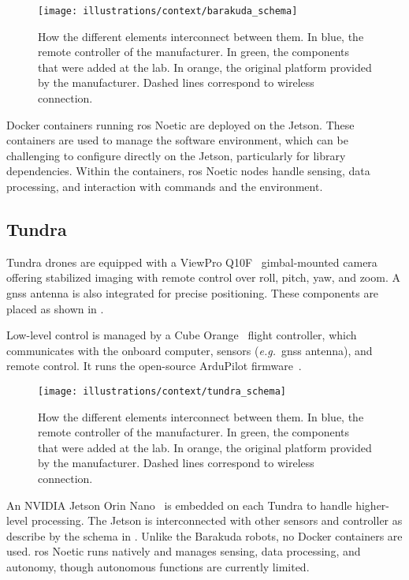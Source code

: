 \begin{figure}[ht!]
    \centering
    \texttt{[image: illustrations/context/barakuda\_schema]}
    \caption{How the different elements interconnect between them.
    In blue, the remote controller of the manufacturer.
    In green, the components that were added at the lab.
    In orange, the original platform provided by the manufacturer.
    Dashed lines correspond to wireless connection.}
    \label{fig:context:barakuda_schematics}
\end{figure}

Docker containers running \gls{ros} Noetic are deployed on the Jetson.
These containers are used to manage the software environment, which can be challenging to configure directly on the Jetson, particularly for library dependencies.
Within the containers, \gls{ros} Noetic nodes handle sensing, data processing, and interaction with commands and the environment.

\subsection{Tundra}\label{subsec:tundra}

Tundra drones are equipped with a ViewPro Q10F~\cite{noauthor_q10f-single_nodate} gimbal-mounted camera
offering stabilized imaging with remote control over roll, pitch, yaw, and zoom.
A \gls{gnss} antenna is also integrated for precise positioning.
These components are placed as shown in .

Low-level control is managed by a Cube Orange~\cite{noauthor_cubepilot_nodate} flight controller,
which communicates with the onboard computer, sensors (\textit{e.g.}\ \gls{gnss} antenna), and remote control.
It runs the open-source ArduPilot firmware~\cite{noauthor_ardupilotardupilot_2025}.

\begin{figure}[ht!]
    \centering
    \texttt{[image: illustrations/context/tundra\_schema]}
    \caption{How the different elements interconnect between them.
    In blue, the remote controller of the manufacturer.
    In green, the components that were added at the lab.
    In orange, the original platform provided by the manufacturer.
    Dashed lines correspond to wireless connection.}
    \label{fig:context:tundra_schematics}
\end{figure}

An NVIDIA Jetson Orin Nano~\cite{noauthor_nvidia_nodate} is embedded on each Tundra to handle higher-level processing.
The Jetson is interconnected with other sensors and controller as describe by the schema in .
Unlike the Barakuda robots, no Docker containers are used.
\gls{ros} Noetic runs natively and manages sensing, data processing, and autonomy, though autonomous functions are currently limited.


